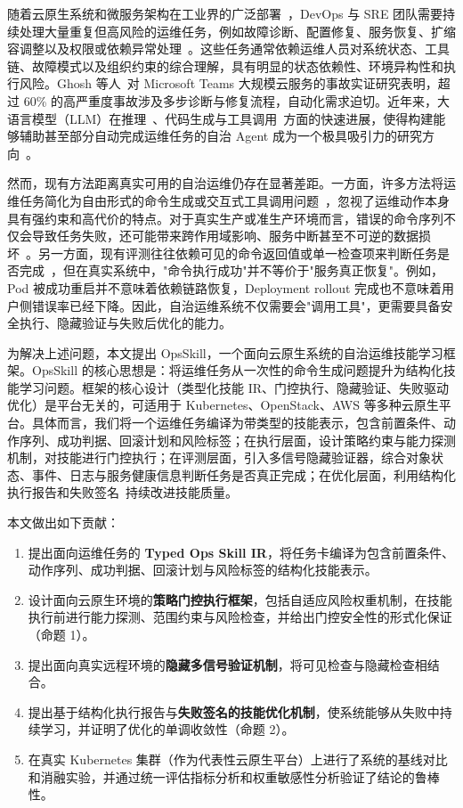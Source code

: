 \documentclass[11pt,a4paper]{ctexart}
\begin{document}
随着云原生系统和微服务架构在工业界的广泛部署~\cite{burns2022kubernetes}，DevOps 与 SRE 团队需要持续处理大量重复但高风险的运维任务，例如故障诊断、配置修复、服务恢复、扩缩容调整以及权限或依赖异常处理~\cite{beyer2016sre}。这些任务通常依赖运维人员对系统状态、工具链、故障模式以及组织约束的综合理解，具有明显的状态依赖性、环境异构性和执行风险。Ghosh 等人~\cite{ghosh2022incidents}对 Microsoft Teams 大规模云服务的事故实证研究表明，超过 60\% 的高严重度事故涉及多步诊断与修复流程，自动化需求迫切。近年来，大语言模型（LLM）在推理~\cite{wei2022chain}、代码生成与工具调用~\cite{yao2023react}方面的快速进展，使得构建能够辅助甚至部分自动完成运维任务的自治 Agent 成为一个极具吸引力的研究方向~\cite{cheng2023aiops}。

然而，现有方法距离真实可用的自治运维仍存在显著差距。一方面，许多方法将运维任务简化为自由形式的命令生成或交互式工具调用问题~\cite{roy2024rca_agents}，忽视了运维动作本身具有强约束和高代价的特点。对于真实生产或准生产环境而言，错误的命令序列不仅会导致任务失败，还可能带来跨作用域影响、服务中断甚至不可逆的数据损坏~\cite{ruan2023toolemu}。另一方面，现有评测往往依赖可见的命令返回值或单一检查项来判断任务是否完成~\cite{ye2024toolsword}，但在真实系统中，"命令执行成功"并不等价于"服务真正恢复"。例如，Pod 被成功重启并不意味着依赖链路恢复，Deployment rollout 完成也不意味着用户侧错误率已经下降。因此，自治运维系统不仅需要会"调用工具"，更需要具备安全执行、隐藏验证与失败后优化的能力。

为解决上述问题，本文提出 OpsSkill，一个面向云原生系统的自治运维技能学习框架。OpsSkill 的核心思想是：将运维任务从一次性的命令生成问题提升为结构化技能学习问题。框架的核心设计（类型化技能 IR、门控执行、隐藏验证、失败驱动优化）是平台无关的，可适用于 Kubernetes、OpenStack、AWS 等多种云原生平台。具体而言，我们将一个运维任务编译为带类型的技能表示，包含前置条件、动作序列、成功判据、回滚计划和风险标签；在执行层面，设计策略约束与能力探测机制，对技能进行门控执行；在评测层面，引入多信号隐藏验证器，综合对象状态、事件、日志与服务健康信息判断任务是否真正完成；在优化层面，利用结构化执行报告和失败签名~\cite{shinn2023reflexion}持续改进技能质量。

本文做出如下贡献：

\begin{enumerate}[leftmargin=2em]
  \item 提出面向运维任务的 \textbf{Typed Ops Skill IR}，将任务卡编译为包含前置条件、动作序列、成功判据、回滚计划与风险标签的结构化技能表示。
  \item 设计面向云原生环境的\textbf{策略门控执行框架}，包括自适应风险权重机制，在技能执行前进行能力探测、范围约束与风险检查，并给出门控安全性的形式化保证（命题 1）。
  \item 提出面向真实远程环境的\textbf{隐藏多信号验证机制}，将可见检查与隐藏检查相结合。
  \item 提出基于结构化执行报告与\textbf{失败签名的技能优化机制}，使系统能够从失败中持续学习，并证明了优化的单调收敛性（命题 2）。
  \item 在真实 Kubernetes 集群（作为代表性云原生平台）上进行了系统的基线对比和消融实验，并通过统一评估指标分析和权重敏感性分析验证了结论的鲁棒性。
\end{enumerate}
\end{document}
